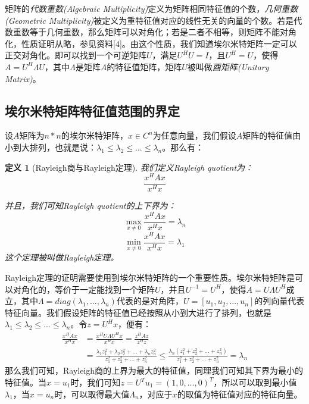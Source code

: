 \documentclass[UTF8, 12pt]{ctexart}
\newtheorem{thm}{定义}
\begin{document}
矩阵的\emph{代数重数(Algebraic Multiplicity)}定义为矩阵相同特征值的个数，\emph{几何重数(Geometric Multiplicity)}被定义为重特征值对应的线性无关的向量的个数。若是代数重数等于几何重数，那么矩阵可以对角化；若是二者不相等，则矩阵不能对角化，性质证明从略，参见资料[4]。由这个性质，我们知道埃尔米特矩阵一定可以正交对角化。即可以找到一个可逆矩阵$U$，满足${U^H}U=I$，且$U^H=U$，使得$A=U^{H}{\Lambda }U$，其中$\Lambda$是矩阵$A$的特征值矩阵，矩阵$U$被叫做\emph{酉矩阵(Unitary Matrix)}。


\subsection{埃尔米特矩阵特征值范围的界定}
设$A$矩阵为$n*n$的埃尔米特矩阵，$x \in C^{n}$为任意向量，我们假设$A$矩阵的特征值由小到大排列，也就是说：${\lambda _1} \le {\lambda _2} \le ... \le {\lambda _n}$。那么有：

\begin{thm}[Rayleigh商与Rayleigh定理]我们定义Rayleigh quotient为：
	\begin{equation}
	\frac{{{x^H}Ax}}{{{x^H}x}}
	\end{equation}
	
	并且，我们可知Rayleigh quotient的上下界为：
	\begin{equation}
	\mathop {\max }\limits_{x \ne 0} \frac{{{x^H}Ax}}{{{x^H}x}} = {\lambda _n}
	\end{equation}
	\begin{equation}
	\mathop {\min }\limits_{x \ne 0} \frac{{{x^H}Ax}}{{{x^H}x}} = {\lambda _1}
	\end{equation}
	这个定理被叫做Rayleigh定理。
\end{thm}

Rayleigh定理的证明需要使用到埃尔米特矩阵的一个重要性质。埃尔米特矩阵是可以对角化的，等价于一定能找到一个矩阵$U$，并且$U^{-1}=U^{H}$，使得$A = U \Lambda U^{H}$成立，其中$\Lambda  = diag({\lambda _1},...,{\lambda _n})$代表的是对角阵，$U = [u_1, u_2,..., u_n]$的列向量代表特征向量。我们假设矩阵的特征值已经按照从小到大进行了排列，也就是${\lambda _1} \le {\lambda _2} \le ... \le {\lambda _n}$。令$z = U^{H}x$，便有：
\begin{align}
	\frac{{{x^H}Ax}}{{{x^H}x}} & = \frac{{{x^H}U\Lambda {U^H}x}}{{{x^H}x}} = \frac{{{z^H}Az}}{{{z^H}z}}\\
							   & = \frac{{{\lambda _1}z_1^2 + {\lambda _2}z_2^2 + ... + {\lambda _n}z_n^2}}{{z_1^2 + z_2^2 + ... + z_n^2}}
							   \le \frac{{{\lambda _n}(z_1^2 + z_2^2 + ... + z_n^2)}}{{z_1^2 + z_2^2 + ... + z_n^2}} = {\lambda _n}
\end{align}
那么我们可知，Rayleigh商的上界为最大的特征值，同理我们可知其下界为最小的特征值。当$x = u_1$时，我们可知$z = U^{T} u_1 = (1, 0, ..., 0)^{T}$，所以可以取到最小值$\lambda _1$，当$x = u_n$时，可以取得最大值$\Lambda_n$，对应于$x$的取值为特征值对应的特征向量。
\end{document}
